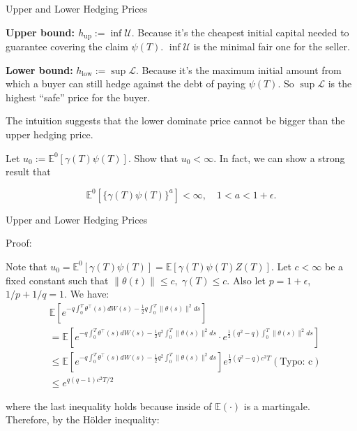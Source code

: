\documentclass{beamer}
\begin{document}
\begin{frame}{Upper and Lower Hedging Prices}

    {\footnotesize \footnotesize
    \par \textbf{Upper bound: $h_{\text{up}} := \inf \mathcal{U}.$}  Because
     it's the cheapest initial capital needed to guarantee covering the claim $\psi(T)$. $\inf \mathcal{U}$ is 
     the minimal fair one for the seller.
      \vspace{1em}
     \par \textbf{Lower bound:} $h_{\text{low}} := \sup \mathcal{L}.$   Because it's the maximum initial 
     amount from which a buyer can still hedge against the debt of paying $\psi(T)$. 
     So $\sup \mathcal{L}$ is the highest ``safe'' price for the buyer.
     \vspace{1em}
     \par The intuition suggests that the lower dominate price cannot be bigger than the upper hedging price.
     \vspace{1em}
      \par Let $u_0 := \mathbb{E}^0[\gamma(T)\psi(T)]$. Show that $u_0 < \infty$. In fact, we can show a strong result that

        \[
        \mathbb{E}^0[\{\gamma(T)\psi(T)\}^a] < \infty, \quad 1 < a < 1 + \epsilon.
        \]
    }
\end{frame} 

\begin{frame}{Upper and Lower Hedging Prices}

    {\footnotesize \footnotesize
    \par Proof:
    \par Note that  $u_0 = \mathbb{E}^0[\gamma(T)\psi(T)] = \mathbb{E}[\gamma(T)\psi(T)Z(T)].$ Let $c < \infty$ be a fixed constant such that
    $\|\theta(t)\| \leq c, \;\gamma(T) \leq c.$ Also let $p = 1 + \epsilon$, $1/p + 1/q = 1$. We have:
    \begin{align*}
        & \mathbb{E} \left[ e^{ -q \int_0^T \theta^\top(s)dW(s) - \frac{1}{2} q \int_0^T \|\theta(s)\|^2 ds }  \right] \\
        &= \mathbb{E} \left[e^{ -q \int_0^T \theta^\top(s)dW(s) - \frac{1}{2} q^2 \int_0^T \|\theta(s)\|^2 ds } \cdot e ^{ \frac{1}{2}(q^2 - q) \int_0^T \|\theta(s)\|^2 ds } \right] \\
        &\leq \mathbb{E} \left[ e^ { -q \int_0^T \theta^\top(s)dW(s) - \frac{1}{2} q^2 \int_0^T \|\theta(s)\|^2 ds } \right] e^{ \frac{1}{2}(q^2 - q)c^2T } (\text{Typo: c}) \\
        &\leq e^{q(q-1)c^2T/2}
    \end{align*}
    \par where the last inequality holds because inside of $\mathbb{E}(\cdot)$ is a martingale. Therefore, by the Hölder inequality:
    }
\end{frame} 
\end{document}
